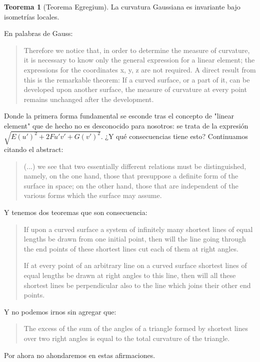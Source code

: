 \documentclass[spanish]{book}
\theoremstyle{definition}
\newtheorem*{teo}{Teorema}
\begin{document}
\begin{teo}[Teorema Egregium] La curvatura Gaussiana es invariante bajo isometrías locales.
\end{teo}
En palabras de Gauss:
\begin{quotation}
	Therefore we notice that, in order to determine the measure of curvature, it is necessary to know only the general expression for a linear element; the expressions for the coordinates x, y, z are not required. A direct result from this is the remarkable theorem: If a curved surface, or a part of it, can be developed upon another surface, the measure of curvature at every point remains unchanged after the development.
\end{quotation}
Donde la primera forma fundamental se esconde tras el concepto de "linear element" que de hecho no es desconocido para nosotros: se trata de la expresión $\sqrt{E(u')^2+2Fu'v'+G(v')^2}$. ¿Y qué consecuencias tiene esto? Continuamos citando el abstract:
\begin{quotation}
	(...) we see that two essentially different relations must be distinguished, namely, on the one hand, those that presuppose a definite form of the surface in space; on the other hand, those that are independent of the various forms which the surface may assume.
\end{quotation}
Y tenemos dos teoremas que son consecuencia:
\begin{quotation}
	If upon a curved surface a system of infinitely many shortest lines of equal lengths be drawn from one initial point, then will the line going through the end points of these shortest lines cut each of them at right angles.
	
	If at every point of an arbitrary line on a curved surface shortest lines of equal lengths be drawn at right angles to this line, then will all these shortest lines be perpendicular also to the line which joins their other end points.
\end{quotation}
Y no podemos irnos sin agregar que:
\begin{quotation}
	The excess of the sum of the angles of a triangle formed by shortest lines over two right angles is equal to the total curvature of the triangle.
\end{quotation}
Por ahora no ahondaremos en estas afirmaciones.
\end{document}

